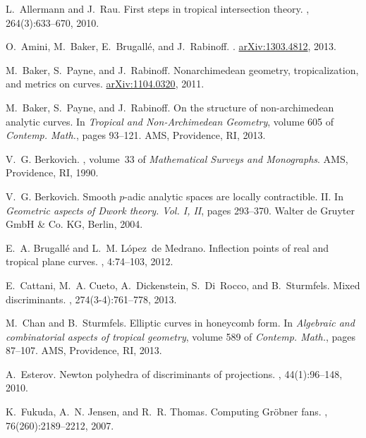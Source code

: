 \documentclass[11pt]{amsart}
\numberwithin{equation}{section}
\theoremstyle{plain}
\theoremstyle{definition}
\theoremstyle{remark}
\begin{document}
 
\begin{thebibliography}{10}

L.~Allermann and J.~Rau.
\newblock First steps in tropical intersection theory.
, 264(3):633--670, 2010.

O.~Amini, M.~Baker, E.~Brugall\'{e}, and J.~Rabinoff.
.
\newblock \url{arXiv:1303.4812}, 2013.

M.~Baker, S.~Payne, and J.~Rabinoff.
\newblock Nonarchimedean geometry, tropicalization, and metrics on curves.
\newblock \url{arXiv:1104.0320}, 2011.

M.~Baker, S.~Payne, and J.~Rabinoff.
\newblock On the structure of non-archimedean analytic curves.
\newblock In {\em Tropical and Non-Archimedean Geometry}, volume 605 of {\em
  Contemp. Math.}, pages 93--121. AMS, Providence, RI, 2013.

V.~G. Berkovich.
, volume~33 of {\em Mathematical Surveys and Monographs}.
\newblock AMS, Providence, RI, 1990.

V.~G. Berkovich.
\newblock Smooth {$p$}-adic analytic spaces are locally contractible. {II}.
\newblock In {\em Geometric aspects of {D}work theory. {V}ol. {I}, {II}}, pages
  293--370. Walter de Gruyter GmbH \& Co. KG, Berlin, 2004.

E.~A. Brugall{\'e} and L.~M. L{\'o}pez~de Medrano.
\newblock Inflection points of real and tropical plane curves.
, 4:74--103, 2012.

E.~Cattani, M.~A. Cueto, A.~Dickenstein, S.~Di~Rocco, and B.~Sturmfels.
\newblock Mixed discriminants.
, 274(3-4):761--778, 2013.

M.~Chan and B.~Sturmfels.
\newblock Elliptic curves in honeycomb form.
\newblock In {\em Algebraic and combinatorial aspects of tropical geometry},
  volume 589 of {\em Contemp. Math.}, pages 87--107. AMS,
  Providence, RI, 2013.

A.~Esterov.
\newblock Newton polyhedra of discriminants of projections.
, 44(1):96--148, 2010.

K.~Fukuda, A.~N. Jensen, and R.~R. Thomas.
\newblock Computing {G}r\"obner fans.
, 76(260):2189--2212, 2007.


\end{thebibliography}
\end{document}
